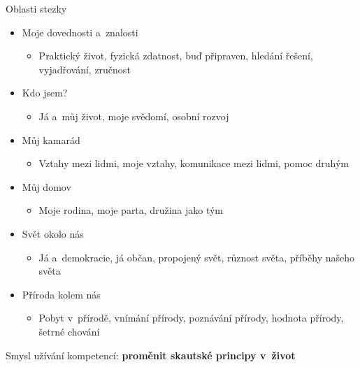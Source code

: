 \documentclass[compress, ucs, xelatex, xcolor=dvipsnames, print,
  hyperref={
    bookmarks=true,
    unicode=true,
    colorlinks=true,
    plainpages=false,
    pdfkeywords={Junak, Pedagogika, Skaut, Skauting, Vychovna metoda},
    linkcolor=Black,
    anchorcolor=Black,
    citecolor=OliveGreen,
    filecolor=OliveGreen,
    menucolor=Black,
    urlcolor=OliveGreen,
    pdftex}
  ]{beamer}
\begin{document}
\begin{frame}{Oblasti stezky}
  \begin{itemize}
    \item Moje dovednosti a~znalosti
    \begin{itemize}
      \item Praktický život, fyzická zdatnost, buď připraven, hledání řešení, vyjadřování, zručnost
    \end{itemize}
    \item Kdo jsem?
    \begin{itemize}
      \item Já a~můj život, moje svědomí, osobní rozvoj
    \end{itemize}
    \item Můj kamarád
    \begin{itemize}
      \item Vztahy mezi lidmi, moje vztahy, komunikace mezi lidmi, pomoc druhým
    \end{itemize}
    \item Můj domov
    \begin{itemize}
      \item Moje rodina, moje parta, družina jako tým
    \end{itemize}
    \item Svět okolo nás
    \begin{itemize}
      \item Já a~demokracie, já občan, propojený svět, různost světa, příběhy našeho světa
    \end{itemize}
    \item Příroda kolem nás
    \begin{itemize}
      \item Pobyt v~přírodě, vnímání přírody, poznávání přírody, hodnota přírody, šetrné chování
    \end{itemize}
  \end{itemize}
  \alert{Smysl užívání kompetencí: \textbf{proměnit skautské principy v~život}}
\end{frame}
\end{document}
